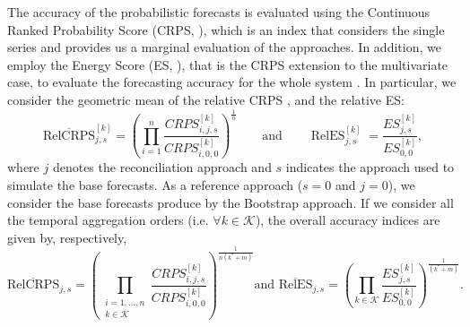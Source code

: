 \documentclass[12pt]{article}
\newcommand{\xvet}{\bm{x}}
\newcommand{\zvet}{\bm{z}}
\theoremstyle{definition}
\begin{document}
The accuracy of the probabilistic forecasts is evaluated using the Continuous Ranked Probability Score (CRPS, \citealp{gneiting2014}), %
which is an index that considers the single series and provides us a marginal evaluation of the approaches. In addition, we employ the Energy Score (ES, \citealp{gneiting2014}), that is the CRPS extension to the multivariate case, to evaluate the forecasting accuracy for the whole system \citep{panagiotelis2023, wickramasuriya2021b}.
In particular, we consider the geometric mean of the relative CRPS \citep{fleming1986}, and the relative ES:
\begin{equation}\label{eq:skill}
	\operatorname{\overline{RelCRPS}}_{j,s}^{[k]} = \left(\prod_{i = 1}^n \frac{CRPS^{[k]}_{i, j, s}}{CRPS^{[k]}_{i, 0, 0}}\right)^{\frac{1}{n}} \qquad \mathrm{and} \qquad \operatorname{RelES}_{j,s}^{[k]} = \frac{ES^{[k]}_{j, s}}{ES^{[k]}_{0, 0}},
\end{equation}
where $j$ denotes the reconciliation approach and $s$ indicates the approach used to simulate the base forecasts. As a reference approach ($s=0$ and $j=0$), we consider the base forecasts produce by the Bootstrap approach. If we consider all the temporal aggregation orders (i.e. $\forall k \in \mathcal{K}$), the overall accuracy indices are given by, respectively, 
\begin{equation}\label{eq:skill_all}
	\operatorname{\overline{RelCRPS}}_{j,s} = \left(\prod_{\substack{i = 1, \dots, n \\ k \in \mathcal{K}}}\frac{CRPS^{[k]}_{i, j, s}}{CRPS^{[k]}_{i, 0, 0}}\right)^{\frac{1}{n(k^\ast+m)}}\mbox{and } \operatorname{\overline{RelES}}_{j,s}= \left(\prod_{k \in \mathcal{K}}\frac{ES^{[k]}_{j, s}}{ES^{[k]}_{0, 0}}\right)^{\frac{1}{(k^\ast+m)}}.
\end{equation}
\end{document}
